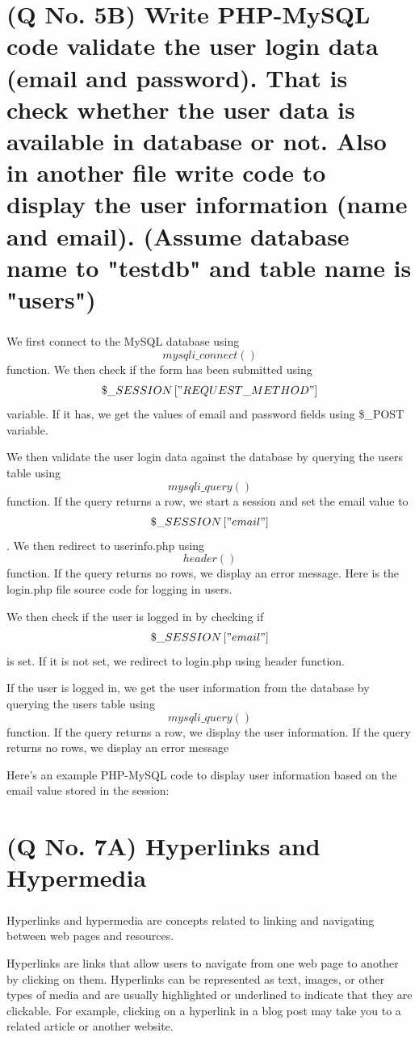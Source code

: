 \documentclass[11pt]{article}
\begin{document}
\section{(Q No. 5B) Write PHP-MySQL code validate the user login data (email and password). That is check whether the user data is available in database or not. Also in another file write code to display the user information (name and email). (Assume database name to "testdb" and table name is "users")}
\subparagraph{}
We first connect to the MySQL database using \[ mysqli\_connect\left(\right) \] function. We then check if the form has been submitted using \[ \$\_SESSION\left[ "REQUEST\_METHOD" \right] \] variable. If it has, we get the values of email and password fields using \$\_POST variable.

We then validate the user login data against the database by querying the users table using \[ mysqli\_query\left(\right) \] function. If the query returns a row, we start a session and set the email value to \[ \$\_SESSION\left[ "email" \right] \]. We then redirect to userinfo.php using \[header()\] function. If the query returns no rows, we display an error message.
Here is the login.php file source code for logging in users.


We then check if the user is logged in by checking if \[ \$\_SESSION\left[ "email" \right] \]  is set. If it is not set, we redirect to login.php using header function.

If the user is logged in, we get the user information from the database by querying the users table using \[ mysqli\_query\left(\right) \] function. If the query returns a row, we display the user information. If the query returns no rows, we display an error message

Here's an example PHP-MySQL code to display user information based on the email value stored in the session:


\section{(Q No. 7A) Hyperlinks and Hypermedia}
\subparagraph{}
Hyperlinks and hypermedia are concepts related to linking and navigating between web pages and resources.

Hyperlinks are links that allow users to navigate from one web page to another by clicking on them. Hyperlinks can be represented as text, images, or other types of media and are usually highlighted or underlined to indicate that they are clickable. For example, clicking on a hyperlink in a blog post may take you to a related article or another website.
\end{document}
